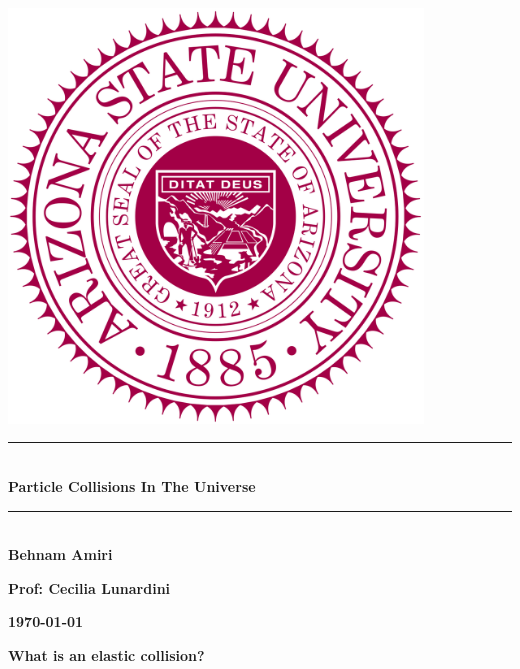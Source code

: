 \documentclass[fleqn]{article}
\begin{document}
  \begin{titlepage}

    \newcommand{\HRule}{\rule{\linewidth}{0.5mm}}

    \center

    \begin{center}
      \includegraphics[height=11cm, width=11cm]{asu.png}
    \end{center}

    \vline

    \HRule \\[0.5cm]
    { \huge \bfseries Particle Collisions In The Universe}\\[0.4cm] 
    \HRule \\[1.0cm]

    \textbf{Behnam Amiri}

    \bigbreak

    \textbf{Prof: Cecilia Lunardini}

    \bigbreak

    \textbf{{\large \today}\\[2cm]}

    \vfill

  \end{titlepage}

  \textbf{What is an elastic collision?}

  \vspace{10px}
\end{document}
